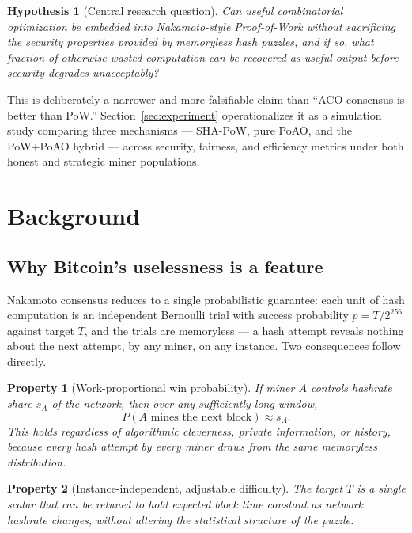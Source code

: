 \documentclass[journal]{IEEEtran}
\newtheorem{property}{Property}
\newtheorem{hypothesis}{Hypothesis}
\begin{document}
\begin{hypothesis}[Central research question]
Can useful combinatorial optimization be embedded into Nakamoto-style
Proof-of-Work without sacrificing the security properties provided by
memoryless hash puzzles, and if so, what fraction of otherwise-wasted
computation can be recovered as useful output before security degrades
unacceptably?
\end{hypothesis}

This is deliberately a narrower and more falsifiable claim than ``ACO
consensus is better than PoW.'' Section~\ref{sec:experiment} operationalizes
it as a simulation study comparing three mechanisms --- SHA-PoW, pure PoAO,
and the PoW+PoAO hybrid --- across security, fairness, and efficiency metrics
under both honest and strategic miner populations.

\section{Background}

\subsection{Why Bitcoin's uselessness is a feature}
\label{sec:why-hard}

Nakamoto consensus reduces to a single probabilistic guarantee: each unit of
hash computation is an independent Bernoulli trial with success probability
$p = T / 2^{256}$ against target $T$, and the trials are memoryless --- a
hash attempt reveals nothing about the next attempt, by any miner, on any
instance. Two consequences follow directly.

\begin{property}[Work-proportional win probability]
\label{prop:proportional}
If miner $A$ controls hashrate share $s_A$ of the network, then over any
sufficiently long window,
\[
P(A \text{ mines the next block}) \approx s_A .
\]
This holds regardless of algorithmic cleverness, private information, or
history, because every hash attempt by every miner draws from the same
memoryless distribution.
\end{property}

\begin{property}[Instance-independent, adjustable difficulty]
\label{prop:difficulty}
The target $T$ is a single scalar that can be retuned to hold expected
block time constant as network hashrate changes, without altering the
statistical structure of the puzzle.
\end{property}
\end{document}
